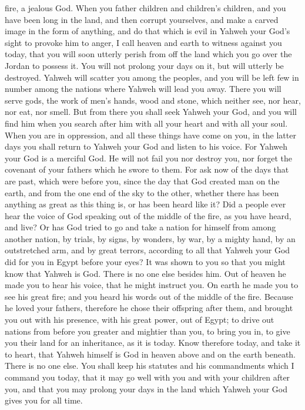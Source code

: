 fire, a jealous God.  When you father children and
children's children, and you have been long in the land, and then
corrupt yourselves, and make a carved image in the form of anything, and
do that which is evil in Yahweh your God's sight to provoke him to
anger,  I call heaven and earth to witness against you
today, that you will soon utterly perish from off the land which you go
over the Jordan to possess it. You will not prolong your days on it, but
will utterly be destroyed.  Yahweh will scatter you among
the peoples, and you will be left few in number among the nations where
Yahweh will lead you away.  There you will serve gods,
the work of men's hands, wood and stone, which neither see, nor hear,
nor eat, nor smell.  But from there you shall seek Yahweh
your God, and you will find him when you search after him with all your
heart and with all your soul.  When you are in
oppression, and all these things have come on you, in the latter days
you shall return to Yahweh your God and listen to his voice.
 For Yahweh your God is a merciful God. He will not fail
you nor destroy you, nor forget the covenant of your fathers which he
swore to them.  For ask now of the days that are past,
which were before you, since the day that God created man on the earth,
and from the one end of the sky to the other, whether there has been
anything as great as this thing is, or has been heard like it?
 Did a people ever hear the voice of God speaking out of
the middle of the fire, as you have heard, and live?  Or
has God tried to go and take a nation for himself from among another
nation, by trials, by signs, by wonders, by war, by a mighty hand, by an
outstretched arm, and by great terrors, according to all that Yahweh
your God did for you in Egypt before your eyes?  It was
shown to you so that you might know that Yahweh is God. There is no one
else besides him.  Out of heaven he made you to hear his
voice, that he might instruct you. On earth he made you to see his great
fire; and you heard his words out of the middle of the fire.
 Because he loved your fathers, therefore he chose their
offspring after them, and brought you out with his presence, with his
great power, out of Egypt;  to drive out nations from
before you greater and mightier than you, to bring you in, to give you
their land for an inheritance, as it is today.  Know
therefore today, and take it to heart, that Yahweh himself is God in
heaven above and on the earth beneath. There is no one else.
 You shall keep his statutes and his commandments which I
command you today, that it may go well with you and with your children
after you, and that you may prolong your days in the land which Yahweh
your God gives you for all time.

